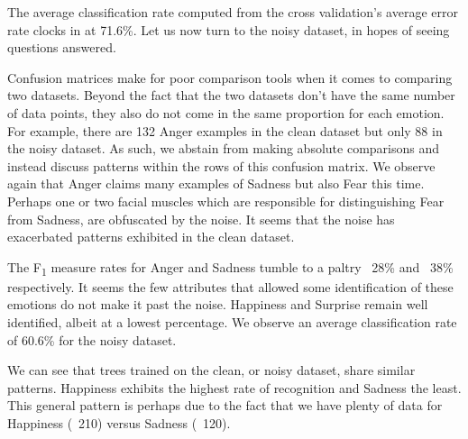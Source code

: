 The average classification rate computed from the cross validation's average error rate
clocks in at 71.6\%. Let us now turn to the noisy dataset, in hopes of seeing questions answered.

 


Confusion matrices make for poor comparison tools when it comes to comparing two datasets.
Beyond the fact that the two datasets don't have the same number of data points,
they also do not come in the same proportion for each emotion. For example, there are 132 Anger examples in the clean dataset but only
88 in the noisy dataset. As such, we abstain from making absolute comparisons and instead discuss patterns within the rows
of this confusion matrix. We observe again that Anger claims many examples of Sadness but also Fear this time. Perhaps one or two facial
muscles which are responsible for distinguishing Fear from Sadness, are obfuscated by the noise.
It seems that the noise has exacerbated patterns exhibited in the clean dataset.



The F\textsubscript{1} measure rates for Anger and Sadness tumble to a paltry ~28\% and ~38\% respectively.
It seems the few attributes that allowed some identification of these emotions do not make it past the noise.
Happiness and Surprise remain well identified, albeit at a lowest percentage.
We observe an average classification rate of 60.6\% for the noisy dataset.


We can see that trees trained on the clean, or noisy dataset, share similar patterns.
Happiness exhibits the highest rate of recognition and Sadness the least.
This general pattern is perhaps due to the fact that we have plenty of data for Happiness (~210) versus Sadness (~120).



